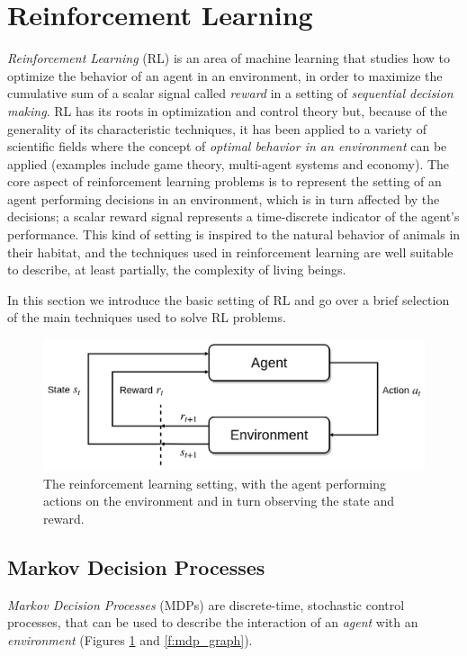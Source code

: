 \section{Reinforcement Learning} \label{s:RL}
\textit{Reinforcement Learning} (RL) is an area of machine learning that
studies how to optimize the behavior of an agent in an environment,
in order to maximize the cumulative sum of a scalar signal called 
\textit{reward} in a setting of \textit{sequential decision making}.
RL has its roots in optimization and control theory but, because of the 
generality of its characteristic techniques, it has been applied to a variety of
scientific fields where the concept of \textit{optimal behavior in an 
environment} can be applied (examples include game theory, multi-agent systems 
and economy).
The core aspect of reinforcement learning problems is to represent the setting
of an agent performing decisions in an environment, which is in turn affected by
the decisions; a scalar reward signal represents a time-discrete indicator of 
the agent's performance. This kind of setting is inspired to the natural 
behavior of animals in their habitat, and the techniques used in reinforcement 
learning are well suitable to describe, at least partially, the complexity of
living beings. 

In this section we introduce the basic setting of RL and go over a brief 
selection of the main techniques used to solve RL problems. 
%
\begin{figure}
    \includegraphics[width=\textwidth]{pictures/reinforcement}
    \centering
    \caption[Reinforcement learning setting]{The reinforcement learning setting, 
	    with the agent performing actions on the environment and in turn 
	    observing the state and reward.}
    \label{f:reinforcement}
\end{figure}
%

\subsection{Markov Decision Processes}
\textit{Markov Decision Processes} (MDPs) are discrete-time, stochastic control 
processes, that can be used to describe the interaction of an \textit{agent} 
with an \textit{environment} (Figures \ref{f:reinforcement} and \ref{f:mdp_graph}).

